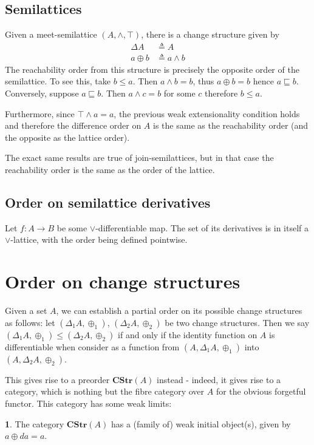 \documentclass[english]{article}
\newcommand{\als}[1]{\begin{align*} #1 \end{align*}}
\newcommand{\A}[1]{\mathbf{#1}}
\theoremstyle{plain}
\theoremstyle{remark}
\theoremstyle{remark}
\theoremstyle{remark}
\theoremstyle{definition}
\theoremstyle{definition}
\newtheorem{prop}[thm]{\protect\propositionname}
\newcommand{\ra}[0]{\rightarrow}
\providecommand{\propositionname}{Proposition}
\begin{document}
\subsection{Semilattices}

Given a meet-semilattice $(A, \wedge, \top)$, there is a change structure given by
\als{
  \Delta A &\triangleq A\\
  a \oplus b &\triangleq a \wedge b
}
The reachability order from this structure is precisely the opposite order of the semilattice.
To see this,
take $b \leq a$. Then $a \wedge b = b$, thus $a \oplus b = b$ hence $a \sqsubseteq b$. Conversely,
suppose $a \sqsubseteq b$. Then $a \wedge c = b$ for some $c$ therefore $b \leq a$.

Furthermore, since $\top \wedge a = a$, the previous weak extensionality condition holds and
therefore the difference order on $A$ is the same as the reachability order (and the opposite as
the lattice order).

The exact same results are true of join-semilattices, but in that case the reachability order
is the same as the order of the lattice.

\subsection{Order on semilattice derivatives}

Let $f : A \ra B$ be some $\vee$-differentiable map. The set of its derivatives is in itself
a $\vee$-lattice, with the order being defined pointwise.

\section{Order on change structures}

Given a set $A$, we can establish a partial order on its possible change structures as follows:
let $(\Delta_1 A, \oplus_1)$, $(\Delta_2 A, \oplus_2)$ be two change structures. Then we say
$(\Delta_1 A, \oplus_1) \leq (\Delta_2 A, \oplus_2)$ if and only if the identity function on
$A$ is differentiable when consider as a function from $(A, \Delta_1 A, \oplus_1)$ into
$(A, \Delta_2 A, \oplus_2)$.

This gives rise to a preorder $\A{CStr}(A)$ instead - indeed, it gives rise to a category,
which is nothing but the fibre category over $A$ for the obvious forgetful functor. This
category has some weak limits:

\begin{prop}
  The category $\A{CStr}(A)$ has a (family of) weak initial object(s), given by
  $a \oplus da = a$.
\end{prop}
\end{document}
